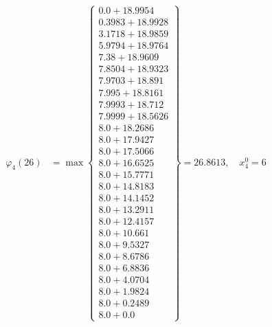 \documentclass{article}
\begin{document}
\begin{align*}
\varphi_{4}(26) &= \max \left\{ \begin{array}{c}
0.0 + 18.9954 \\
 0.3983 + 18.9928 \\
 3.1718 + 18.9859 \\
 5.9794 + 18.9764 \\
 7.38 + 18.9609 \\
 7.8504 + 18.9323 \\
 7.9703 + 18.891 \\
 7.995 + 18.8161 \\
 7.9993 + 18.712 \\
 7.9999 + 18.5626 \\
 8.0 + 18.2686 \\
 8.0 + 17.9427 \\
 8.0 + 17.5066 \\
 8.0 + 16.6525 \\
 8.0 + 15.7771 \\
 8.0 + 14.8183 \\
 8.0 + 14.1452 \\
 8.0 + 13.2911 \\
 8.0 + 12.4157 \\
 8.0 + 10.661 \\
 8.0 + 9.5327 \\
 8.0 + 8.6786 \\
 8.0 + 6.8836 \\
 8.0 + 4.0704 \\
 8.0 + 1.9824 \\
 8.0 + 0.2489 \\
 8.0 + 0.0
\end{array} \right\}=26.8613, \quad x_{4}^0=6\\
  

\end{align*}
\end{document}
